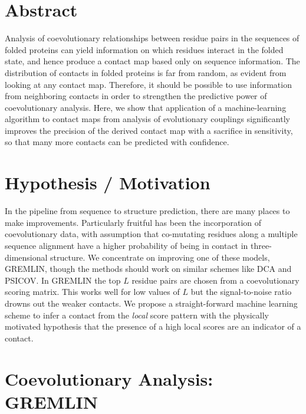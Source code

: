 \documentclass[landscape]{sciposter}
\begin{document}
\begin{multicols}{3}

\section*{Abstract}
Analysis of coevolutionary relationships between residue pairs in the sequences of folded proteins can yield information on which residues interact in the folded state, and hence produce a contact map based only on sequence information. 
The distribution of contacts in folded proteins is far from random, as evident from looking at any contact map. 
Therefore, it should be possible to use information from neighboring contacts in order to strengthen the predictive power of coevolutionary analysis. 
Here, we show that application of a machine-learning algorithm to contact maps from analysis of evolutionary couplings significantly improves the precision of the derived contact map with a sacrifice in sensitivity, so that many more contacts can be predicted with confidence. 

\vfill
\columnbreak

\section*{Hypothesis / Motivation}

In the pipeline from sequence to structure prediction, there are many places to make improvements.
Particularly fruitful has been the incorporation of coevolutionary data, with assumption that co-mutating residues along a multiple sequence alignment have a higher probability of being in contact in three-dimensional structure.
\vfill
We concentrate on improving one of these models, GREMLIN\cite{kamisetty2013assessing}, though the methods should work on similar schemes like DCA and PSICOV.
In GREMLIN the top $L$ residue pairs are chosen from a coevolutionary scoring matrix. 
This works well for low values of $L$ but the signal-to-noise ratio drowns out the weaker contacts.
\vfill
We propose a straight-forward machine learning scheme to infer a contact from the \emph{local} score pattern with the physically motivated hypothesis that the presence of a high local scores are an indicator of a contact.

\vfill
\columnbreak

\section*{Coevolutionary Analysis: GREMLIN\cite{kamisetty2013assessing}}


\end{multicols}
\end{document}
